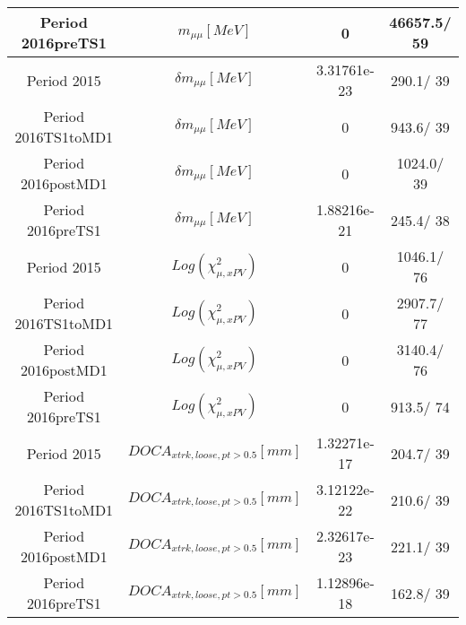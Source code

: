 \documentclass{article}
\begin{document}
\begin{longtable}{c|c|c|c}
\hline
 Period 2016preTS1 & $m_{\mu\mu} [MeV]$ & 0 & 46657.5/ 59\\
\hline
 Period 2015 & $\delta m_{\mu\mu} [MeV]$ & 3.31761e-23 & 290.1/ 39\\
\hline
 Period 2016TS1toMD1 & $\delta m_{\mu\mu} [MeV]$ & 0 & 943.6/ 39\\
\hline
 Period 2016postMD1 & $\delta m_{\mu\mu} [MeV]$ & 0 & 1024.0/ 39\\
\hline
 Period 2016preTS1 & $\delta m_{\mu\mu} [MeV]$ & 1.88216e-21 & 245.4/ 38\\
\hline
 Period 2015 & $Log(\chi^{2}_{\mu,xPV})$ & 0 & 1046.1/ 76\\
\hline
 Period 2016TS1toMD1 & $Log(\chi^{2}_{\mu,xPV})$ & 0 & 2907.7/ 77\\
\hline
 Period 2016postMD1 & $Log(\chi^{2}_{\mu,xPV})$ & 0 & 3140.4/ 76\\
\hline
 Period 2016preTS1 & $Log(\chi^{2}_{\mu,xPV})$ & 0 & 913.5/ 74\\
\hline
 Period 2015 & $DOCA_{xtrk, loose, pt>0.5} [mm]$ & 1.32271e-17 & 204.7/ 39\\
\hline
 Period 2016TS1toMD1 & $DOCA_{xtrk, loose, pt>0.5} [mm]$ & 3.12122e-22 & 210.6/ 39\\
\hline
 Period 2016postMD1 & $DOCA_{xtrk, loose, pt>0.5} [mm]$ & 2.32617e-23 & 221.1/ 39\\
\hline
 Period 2016preTS1 & $DOCA_{xtrk, loose, pt>0.5} [mm]$ & 1.12896e-18 & 162.8/ 39\\
\hline
\end{longtable}
\end{document}
